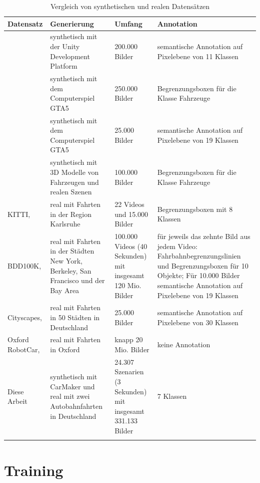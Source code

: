 \begin{longtable}[c]{p{2cm} p{3.5cm} p{2.5cm} p{4cm}}
\textbf{Datensatz} & \textbf{Generierung} & \textbf{Umfang} & \textbf{Annotation} \\
\hline
\endhead

\cite{ros2016synthia} & synthetisch mit der Unity Development Platform & 200.000 Bilder & semantische Annotation auf Pixelebene von 11 Klassen  \\
\hline
\cite{johnson2017driving} & synthetisch mit dem Computerspiel GTA5 & 250.000 Bilder & Begrenzungsboxen für die Klasse Fahrzeuge \\
\hline
\cite{richter2016playing} & synthetisch mit dem Computerspiel GTA5 & 25.000 Bilder & semantische Annotation auf Pixelebene von 19 Klassen \\
\hline
\cite{tremblay2018training} & synthetisch mit 3D Modelle von Fahrzeugen und realen Szenen & 100.000 Bilder & Begrenzungsboxen für die Klasse Fahrzeuge \\
\hline
KITTI, \cite{geiger2013vision} & real mit Fahrten in der Region Karlsruhe & 22 Videos und 15.000 Bilder & Begrenzungsboxen mit 8 Klassen \\
\hline
BDD100K, \cite{yu2018bdd100k} & real mit Fahrten in der Städten New York, Berkeley, San Francisco und der Bay Area & 100.000 Videos (40 Sekunden) mit insgesamt 120 Mio. Bilder & für jeweils das zehnte Bild aus jedem Video: Fahrbahnbegrenzungslinien und Begrenzungsboxen für 10 Objekte; Für 10.000 Bilder semantische Annotation auf Pixelebene von 19 Klassen \\
\hline
Cityscapes, \cite{cordts2016cityscapes} & real mit Fahrten in 50 Städten in Deutschland & 25.000 Bilder & semantische Annotation auf Pixelebene von 30 Klassen \\
\hline
Oxford RobotCar, \cite{maddern20171} & real mit Fahrten in Oxford & knapp 20 Mio. Bilder & keine Annotation \\
\hline
Diese Arbeit & synthetisch mit CarMaker und real mit zwei Autobahnfahrten in Deutschland & 24.307 Szenarien (3 Sekunden) mit insgesamt 331.133 Bilder & 7 Klassen \\

\hline
\caption{Vergleich von synthetischen und realen Datensätzen}
\label{tab_datensaetze}
\end{longtable}


\section{Training}
\label{umsetzung_training}

